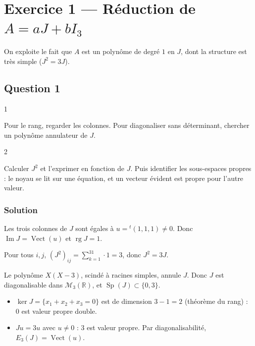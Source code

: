 \documentclass[11pt,a4paper]{article}
\providecommand{\tightlist}{\setlength{\itemsep}{0pt}\setlength{\parskip}{0pt}}
\begin{document}
\hypertarget{exercice-1-ruxe9duction-de-aajbi_3}{%
\section{\texorpdfstring{Exercice 1 --- Réduction de \(A=aJ+bI_3\)}{Exercice 1 --- Réduction de A=aJ+bI\_3}}\label{exercice-1-ruxe9duction-de-aajbi_3}}

On exploite le fait que \(A\) est un polynôme de degré \(1\) en \(J\), dont la structure est très simple (\(J^2=3J\)).

\hypertarget{question-1}{%
\subsection{Question 1}\label{question-1}}

\begin{indication}{1}

Pour le rang, regarder les colonnes. Pour diagonaliser sans déterminant, chercher un polynôme annulateur de \(J\).

\end{indication}

\begin{indication}{2}

Calculer \(J^2\) et l'exprimer en fonction de \(J\). Puis identifier les sous-espaces propres : le noyau se lit sur une équation, et un vecteur évident est propre pour l'autre valeur.

\end{indication}

\hypertarget{solution}{%
\subsubsection{Solution}\label{solution}}

Les trois colonnes de \(J\) sont égales à \(u={}^t(1,1,1)\neq0\). Donc \(\operatorname{Im}J=\operatorname{Vect}(u)\) et \(\boxed{\operatorname{rg}J=1}\).

Pour tous \(i,j\), \((J^2)_{ij}=\sum_{k=1}^31\cdot1=3\), donc \(J^2=3J\).

Le polynôme \(X(X-3)\), scindé à racines simples, annule \(J\). Donc \(J\) est diagonalisable dans \(\mathcal M_3(\mathbb R)\), et \(\operatorname{Sp}(J)\subset\{0,3\}\).

\begin{itemize}
\tightlist
\item
  \(\ker J=\{x_1+x_2+x_3=0\}\) est de dimension \(3-1=2\) (théorème du rang) : \(0\) est valeur propre double.
\item
  \(Ju=3u\) avec \(u\neq0\) : \(3\) est valeur propre. Par diagonalisabilité, \(E_3(J)=\operatorname{Vect}(u)\).
\end{itemize}
\end{document}
